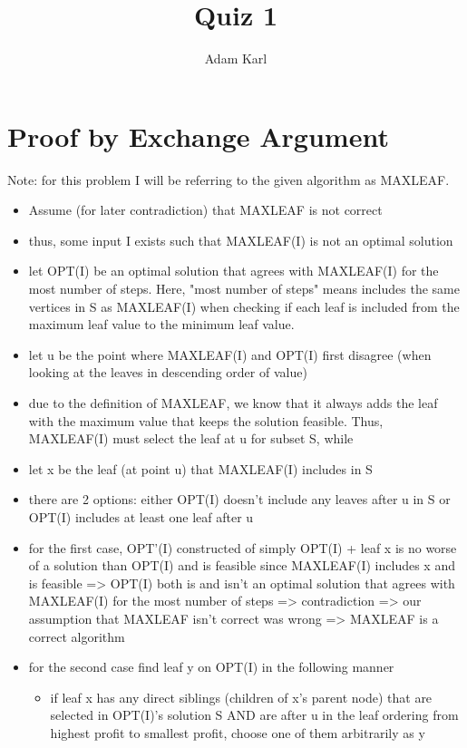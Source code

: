 \documentclass[a4paper]{article}
\title{Quiz 1}
\author{Adam Karl}
\begin{document}
\maketitle


\section{Proof by Exchange Argument}

Note: for this problem I will be referring to the given algorithm as MAXLEAF.

\begin{itemize}
    \item Assume (for later contradiction) that MAXLEAF is not correct
    \item thus, some input I exists such that MAXLEAF(I) is not an optimal solution
    \item let OPT(I) be an optimal solution that agrees with MAXLEAF(I) for the most number of steps. Here, "most number of steps" means includes the same vertices in S as MAXLEAF(I) when checking if each leaf is included from the maximum leaf value to the minimum leaf value.
    \item let u be the point where MAXLEAF(I) and OPT(I) first disagree (when looking at the leaves in descending order of value)
    \item due to the definition of MAXLEAF, we know that it always adds the leaf with the maximum value that keeps the solution feasible. Thus, MAXLEAF(I) must select the leaf at u for subset S, while 
    \item let x be the leaf (at point u) that MAXLEAF(I) includes in S
    \item there are 2 options: either OPT(I) doesn't include any leaves after u in S or OPT(I) includes at least one leaf after u
    \item for the first case, OPT'(I) constructed of simply OPT(I) + leaf x is no worse of a solution than OPT(I) and is feasible since MAXLEAF(I) includes x and is feasible => OPT(I) both is and isn't an optimal solution that agrees with MAXLEAF(I) for the most number of steps => contradiction => our assumption that MAXLEAF isn't correct was wrong => MAXLEAF is a correct algorithm
    \item for the second case find leaf y on OPT(I) in the following manner
    \begin{itemize}
        \item if leaf x has any direct siblings (children of x's parent node) that are selected in OPT(I)'s solution S AND are after u in the leaf ordering from highest profit to smallest profit, choose one of them arbitrarily as y

\end{itemize}
\end{itemize}
\end{document}
